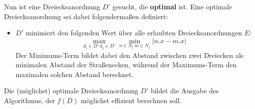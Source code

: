 \documentclass[a4paper, notitlepage, 12pt]{scrartcl}
\begin{document}
Nun ist eine Dreiecksanordnung $D'$ gesucht, die \textbf{optimal} ist. Eine optimale Dreiecksanordnung sei dabei folgendermaßen definiert:
\begin{itemize}
	\item $D'$ minimiert den folgenden Wert über alle erlaubten Dreiecksanordnungen $E$:
	\begin{equation}
	\max_{d_i \in D' ~ d_j \in D'} \min_{n \in N_i ~ m \in N_j} | n.x - m.x |
	\end{equation}
	Der Minimums-Term bildet dabei den Abstand zwischen zwei Dreiecken als minimalen Abstand der Straßenecken, während der Maximums-Term den maximalen solchen Abstand berechnet.
\end{itemize}
 Die (möglichst) optimale Dreiecksanordnung $D'$ bildet die Ausgabe des Algorithmus, der $f(D)$ möglichst effizient berechnen soll.
\end{document}
